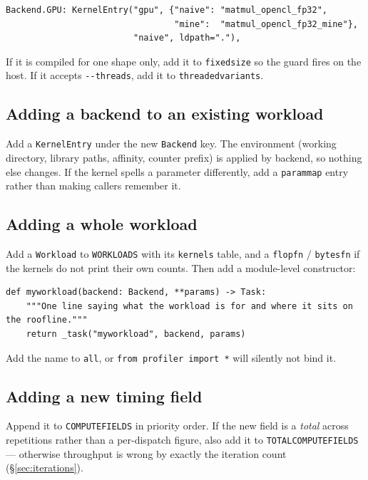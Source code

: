 \documentclass[11pt,a4paper]{article}
\newcommand{\code}[1]{\texttt{\let\_\breakableunderscore #1}}
\newcommand{\breakableunderscore}{\textunderscore\allowbreak}
\begin{document}
\begin{lstlisting}
Backend.GPU: KernelEntry("gpu", {"naive": "matmul_opencl_fp32",
                                 "mine":  "matmul_opencl_fp32_mine"},
                         "naive", ldpath="."),
\end{lstlisting}

\noindent If it is compiled for one shape only, add it to \code{fixed\_size} so
the guard fires on the host. If it accepts \code{-{}-threads}, add it to
\code{threaded\_variants}.

\subsection{Adding a backend to an existing workload}

Add a \code{KernelEntry} under the new \code{Backend} key. The environment
(working directory, library paths, affinity, counter prefix) is applied by
backend, so nothing else changes. If the kernel spells a parameter differently,
add a \code{param\_map} entry rather than making callers remember it.

\subsection{Adding a whole workload}

Add a \code{Workload} to \code{WORKLOADS} with its \code{kernels} table, and a
\code{flop\_fn} / \code{bytes\_fn} if the kernels do not print their own counts.
Then add a module-level constructor:

\begin{lstlisting}
def myworkload(backend: Backend, **params) -> Task:
    """One line saying what the workload is for and where it sits on the roofline."""
    return _task("myworkload", backend, params)
\end{lstlisting}

\noindent Add the name to \code{\_\_all\_\_}, or \code{from profiler import *}
will silently not bind it.

\subsection{Adding a new timing field}

Append it to \code{\_COMPUTE\_FIELDS} in priority order. If the new field is a
\emph{total} across repetitions rather than a per-dispatch figure, also add it
to \code{\_TOTAL\_COMPUTE\_FIELDS} --- otherwise throughput is wrong by exactly
the iteration count (\S\ref{sec:iterations}).
\end{document}
